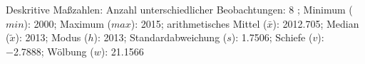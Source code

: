                     \begin{noten}
                	    \note{} Deskritive Maßzahlen:
                	    Anzahl unterschiedlicher Beobachtungen: 8%
                	    ; 
                	      Minimum ($min$): 2000; 
                	      Maximum ($max$): 2015; 
                	      arithmetisches Mittel ($\bar{x}$): \num[round-mode=places,round-precision=2]{2012,705}; 
                	      Median ($\tilde{x}$): 2013; 
                	      Modus ($h$): 2013; 
                	      Standardabweichung ($s$): \num[round-mode=places,round-precision=2]{1,7506}; 
                	      Schiefe ($v$): \num[round-mode=places,round-precision=2]{-2,7888}; 
                	      Wölbung ($w$): \num[round-mode=places,round-precision=2]{21,1566}
                     \end{noten}


